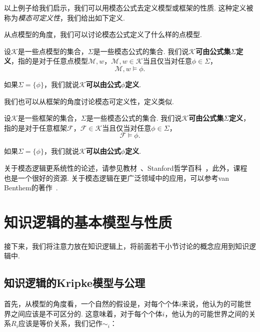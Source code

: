 以上例子给我们启示，我们可以用模态公式去定义模型或框架的性质. 这种定义被称为\textit{模态可定义性}，我们给出如下定义. 

从点模型的角度，我们可以讨论模态公式定义了什么样的点模型. 

\begin{definition}[点模型可定义性]
设$\mathcal{K}$是一些点模型的集合，$\Sigma$是一些模态公式的集合. 我们说\textbf{$\mathcal{K}$可由公式集$\Sigma$定义}，指的是对于任意点模型$\mathcal{M}, w$，$\mathcal{M}, w \in \mathcal{K}$当且仅当对任意$\phi\in\Sigma$，
\[ \mathcal{M}, w \vDash \phi. \]

如果$\Sigma = \{\phi\}$，我们就说\textbf{$\mathcal{K}$可以由公式$\phi$定义}. 
\end{definition}

我们也可以从框架的角度讨论模态可定义性，定义类似. 

\begin{definition}[框架可定义性]
设$\mathcal{K}$是一些框架的集合，$\Sigma$是一些模态公式的集合. 我们说\textbf{$\mathcal{K}$可由公式集$\Sigma$定义}，指的是对于任意框架$\mathcal{F}$，$\mathcal{F} \in \mathcal{K}$当且仅当对任意$\phi\in\Sigma$，
\[ \mathcal{F} \vDash \phi. \]

如果$\Sigma = \{\phi\}$，我们就说\textbf{$\mathcal{K}$可以由公式$\phi$定义}. 
\end{definition}

\begin{remark}
    关于模态逻辑更系统性的论述，请参见教材~\cite{blackburnModalLogic2001}、Stanford哲学百科~\cite{garsonModalLogic2024}，此外，课程~\cite{WangYanJingAdvancedModalLogic} 也是一个很好的资源. 关于模态逻辑在更广泛领域中的应用，可以参考van Benthem的著作~\cite{benthemModalLogicOpen2010}.
\end{remark}

\section{知识逻辑的基本模型与性质}\label{sec:epistemic-logic-basic-model}

接下来，我们将注意力放在知识逻辑上，将前面若干小节讨论的概念应用到知识逻辑中. 

\subsection{知识逻辑的Kripke模型与公理}

首先，从模型的角度看，一个自然的假设是，对每个个体$i$来说，他认为的可能世界之间应该是不可区分的. 这意味着，对于每个个体$i$，他认为的可能世界之间的关系$R_i$应该是等价关系，我们记作$\sim_i$：

